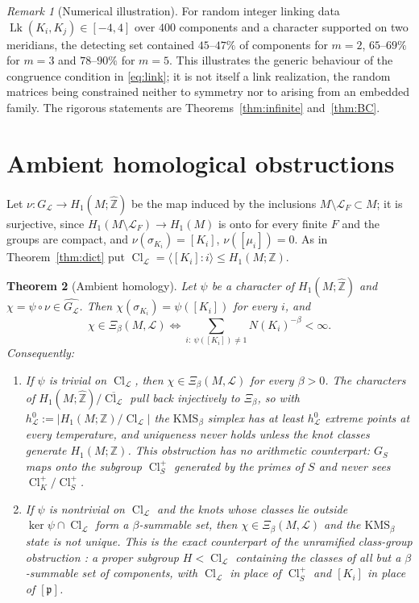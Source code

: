 \documentclass[11pt]{amsart}
\numberwithin{equation}{section}
\newtheorem{theorem}{Theorem}[section]
\theoremstyle{definition}
\theoremstyle{remark}
\newtheorem{remark}[theorem]{Remark}
\newcommand{\Z}{\mathbb{Z}}
\newcommand{\hZ}{\widehat{\Z}}
\newcommand{\cL}{\mathcal{L}}
\newcommand{\pp}{\mathfrak{p}}
\newcommand{\Cl}{\operatorname{Cl}}
\newcommand{\Lk}{\operatorname{Lk}}
\begin{document}
\begin{remark}[Numerical illustration]\label{rem:numdensity}
For random integer linking data $\Lk(K_i,K_j)\in[-4,4]$ over $400$ components and a character
supported on two meridians, the detecting set contained $45$--$47\%$ of components for $m=2$,
$65$--$69\%$ for $m=3$ and $78$--$90\%$ for $m=5$. This illustrates the generic behaviour of
the congruence condition in \eqref{eq:link}; it is not itself a link realization, the random
matrices being constrained neither to symmetry nor to arising from an embedded family. The
rigorous statements are Theorems~\ref{thm:infinite} and~\ref{thm:BC}.
\end{remark}

\section{Ambient homological obstructions}\label{sec:ambient}

Let $\nu:G_\cL\to H_1(M;\hZ)$ be the map induced by the inclusions $M\setminus\cL_F\subset M$;
it is surjective, since $H_1(M\setminus\cL_F)\to H_1(M)$ is onto for every finite $F$ and the
groups are compact, and $\nu(\sigma_{K_i})=[K_i]$, $\nu([\mu_i])=0$. As in
Theorem~\ref{thm:dict} put $\Cl_\cL=\langle[K_i]:i\rangle\le H_1(M;\Z)$.

\begin{theorem}[Ambient homology]\label{thm:ambient}
Let $\psi$ be a character of $H_1(M;\hZ)$ and $\chi=\psi\circ\nu\in\widehat{G_\cL}$. Then
$\chi(\sigma_{K_i})=\psi([K_i])$ for every $i$, and
\[
\chi\in\Xi_\beta(M,\cL)\iff\sum_{i:\ \psi([K_i])\ne1}N(K_i)^{-\beta}<\infty .
\]
Consequently:
\begin{enumerate}
\item If $\psi$ is trivial on $\Cl_\cL$, then $\chi\in\Xi_\beta(M,\cL)$ for every $\beta>0$.
The characters of $H_1(M;\hZ)/\overline{\Cl_\cL}$ pull back injectively to $\Xi_\beta$, so
with $h^0_\cL:=|H_1(M;\Z)/\Cl_\cL|$ the $\mathrm{KMS}_\beta$ simplex has at least $h^0_\cL$
extreme points at every temperature, and uniqueness never holds unless the knot classes
generate $H_1(M;\Z)$. This obstruction has no arithmetic counterpart: $G_S$ maps onto the
subgroup $\Cl^+_S$ generated by the primes of $S$ and never sees $\Cl^+_K/\Cl^+_S$.
\item If $\psi$ is nontrivial on $\Cl_\cL$ and the knots whose classes lie outside
$\ker\psi\cap\Cl_\cL$ form a $\beta$-summable set, then $\chi\in\Xi_\beta(M,\cL)$ and the
$\mathrm{KMS}_\beta$ state is not unique. This is the exact counterpart of the unramified
class-group obstruction \cite[Prop.~4.1]{Main}: a proper subgroup $H<\Cl_\cL$ containing the
classes of all but a $\beta$-summable set of components, with $\Cl_\cL$ in place of $\Cl^+_S$
and $[K_i]$ in place of $[\pp]$.
\end{enumerate}
\end{theorem}
\end{document}
